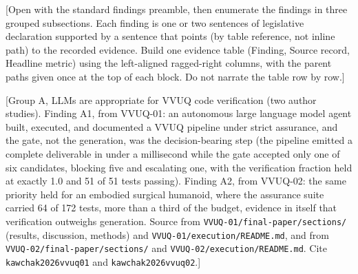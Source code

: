 
[Open with the standard findings preamble, then enumerate the findings in three
grouped subsections. Each finding is one or two sentences of legislative
declaration supported by a sentence that points (by table reference, not inline
path) to the recorded evidence. Build one evidence table (Finding, Source record,
Headline metric) using the left-aligned ragged-right columns, with the parent
paths given once at the top of each block. Do not narrate the table row by row.]

[Group A, LLMs are appropriate for VVUQ code verification (two author studies).
Finding A1, from VVUQ-01: an autonomous large language model agent built,
executed, and documented a VVUQ pipeline under strict assurance, and the gate, not
the generation, was the decision-bearing step (the pipeline emitted a complete
deliverable in under a millisecond while the gate accepted only one of six
candidates, blocking five and escalating one, with the verification fraction held
at exactly 1.0 and 51 of 51 tests passing). Finding A2, from VVUQ-02: the same
priority held for an embodied surgical humanoid, where the assurance suite carried
64 of 172 tests, more than a third of the budget, evidence in itself that
verification outweighs generation. Source from
\texttt{VVUQ-01/final-paper/sections/} (results, discussion, methods) and
\texttt{VVUQ-01/execution/README.md}, and from
\texttt{VVUQ-02/final-paper/sections/} and \texttt{VVUQ-02/execution/README.md}.
Cite \texttt{kawchak2026vvuq01} and \texttt{kawchak2026vvuq02}.]

